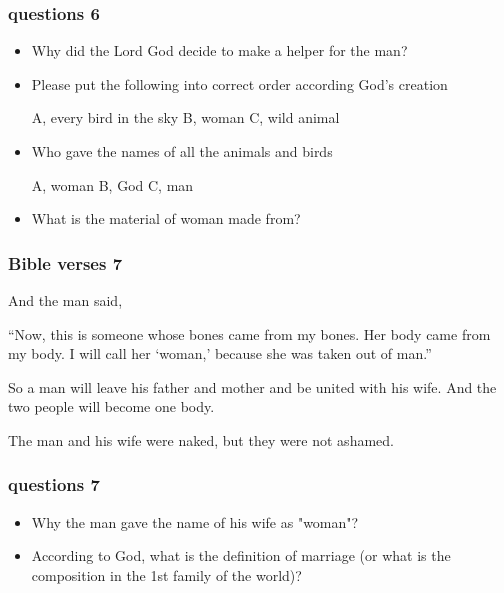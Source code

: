 \documentclass{beamer}
\begin{document}
\begin{frame}
\frametitle{questions 6}
\begin{itemize}
\item Why did the Lord God decide to make a helper for the man?
\item Please put the following into correct order according God's creation 

A, every bird in the sky \hspace{1cm} B, woman \hspace{1cm} C, wild animal

\item Who gave the names of all the animals and birds

A, woman\hspace{1cm} B, God \hspace{1cm} C, man

\item What is the material of woman made from?

\end{itemize}
\end{frame}


\begin{frame}
\frametitle{Bible verses 7}
And the man said,

“Now, this is someone whose bones came from my bones.
    Her body came from my body.
I will call her ‘woman,’
    because she was taken out of man.”

So a man will leave his father and mother and be united with his wife. And the two people will become one body.

The man and his wife were naked, but they were not ashamed.


\end{frame}


\begin{frame}
\frametitle{questions 7}
\begin{itemize}
\item Why the man gave the name of his wife as "woman"?
\item According to God, what is the definition of marriage (or what is the composition in the 1st family of the world)?
\end{itemize}
\end{frame}
\end{document}
